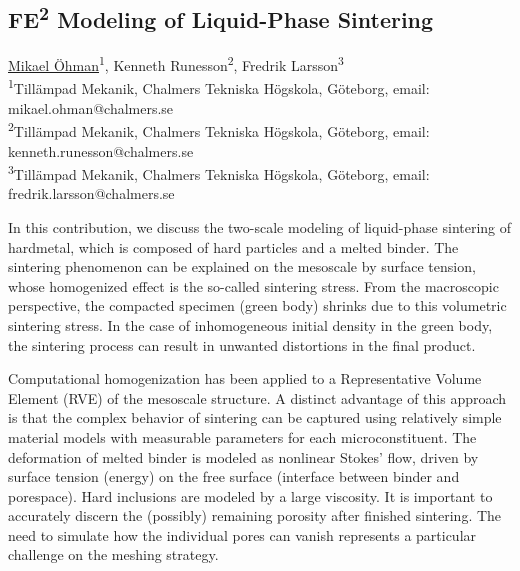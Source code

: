 \documentclass{article}
\begin{document}
\begin{center}
\section*{FE\textsuperscript{2} Modeling of Liquid-Phase Sintering}
%
\begin{minipage}[t]{\textwidth}
\centering
\underline{Mikael Öhman}\textsuperscript{1}, Kenneth Runesson\textsuperscript{2},  Fredrik Larsson\textsuperscript{3}\\
\vspace{0.5cm}
\textsuperscript{1}Tillämpad Mekanik, Chalmers Tekniska Högskola, Göteborg, email: mikael.ohman@chalmers.se\\
\textsuperscript{2}Tillämpad Mekanik, Chalmers Tekniska Högskola, Göteborg, email: kenneth.runesson@chalmers.se\\
\textsuperscript{3}Tillämpad Mekanik, Chalmers Tekniska Högskola, Göteborg, email: fredrik.larsson@chalmers.se
\end{minipage}
\end{center}

\large
In this contribution, we discuss the two-scale modeling of liquid-phase sintering of hardmetal, which is composed of hard particles and a melted binder.
The sintering phenomenon can be explained on the mesoscale by surface tension, whose homogenized effect is the so-called sintering stress.
From the macroscopic perspective, the compacted specimen (green body) shrinks due to this volumetric sintering stress. In the case of inhomogeneous
initial density in the green body, the sintering process can result in unwanted distortions in the final product.

Computational homogenization has been applied to a Representative Volume Element (RVE) of the mesoscale structure.
A distinct advantage of this approach is that the complex behavior of sintering can be captured using relatively simple material models with
measurable parameters for each microconstituent. The deformation of melted binder is modeled as nonlinear Stokes' flow, driven by surface
tension (energy) on the free surface (interface between binder and porespace). Hard inclusions are modeled by a large viscosity.
It is important to accurately discern the (possibly) remaining porosity after finished sintering.
The need to simulate how the individual pores can vanish represents a particular challenge on the meshing strategy.
\end{document}
